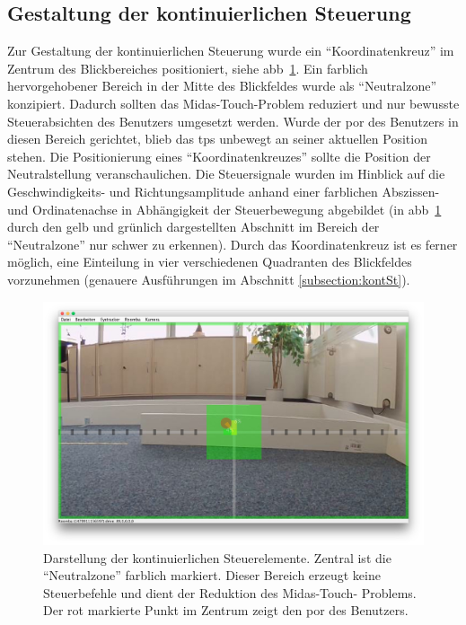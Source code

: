 \subsection{Gestaltung der kontinuierlichen Steuerung}
Zur Gestaltung der kontinuierlichen Steuerung wurde ein \enquote{Koordinatenkreuz} im Zentrum des Blickbereiches positioniert, siehe \acs{abb}~\ref{fig:contMode}. Ein farblich hervorgehobener Bereich in der Mitte des Blickfeldes wurde als \enquote{Neutralzone} konzipiert. Dadurch sollten das Midas-Touch-Problem reduziert und nur bewusste Steuerabsichten des Benutzers umgesetzt werden. Wurde der \acs{por} des Benutzers in diesen Bereich gerichtet, blieb das \acs{tps} unbewegt an seiner aktuellen Position stehen. Die Positionierung eines \enquote{Koordinatenkreuzes} sollte die Position der Neutralstellung veranschaulichen. Die Steuersignale wurden im Hinblick auf die Geschwindigkeits- und Richtungsamplitude anhand einer farblichen Abszissen- und Ordinatenachse in Abhängigkeit der Steuerbewegung abgebildet (in \acs{abb}~\ref{fig:contMode} durch den gelb und grünlich dargestellten Abschnitt im Bereich der \enquote{Neutralzone} nur schwer zu erkennen). Durch das Koordinatenkreuz ist es ferner möglich, eine Einteilung in vier verschiedenen Quadranten des Blickfeldes vorzunehmen (genauere Ausführungen im Abschnitt \ref{subsection:kontSt}).
\begin{figure}[ht]
\begin{center}
\includegraphics[width=\textwidth]{bilder/implementierung/continuousMode.JPG}
\end{center}
\caption{Darstellung der kontinuierlichen Steuerelemente. Zentral ist die \enquote{Neutralzone} farblich markiert. Dieser Bereich erzeugt keine Steuerbefehle und dient der Reduktion des Midas-Touch- Problems. Der rot markierte Punkt im Zentrum zeigt den \acs{por} des Benutzers.}
\label{fig:contMode}
\end{figure}


